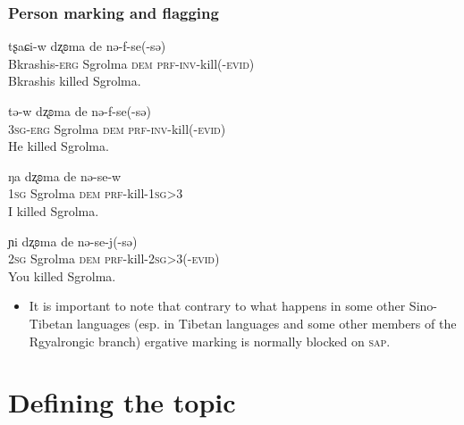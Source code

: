 \documentclass[xcolor=table]{beamer}
\newcommand{\ipa}[1]{{\phon #1}} %
\newcommand{\ipapl}[1]{{\phondroit #1}}
\newcommand{\dem}{\textsc{dem}}
\newcommand{\erg}{\textsc{erg}}
\newcommand{\evid}{\textsc{evid}}
\newcommand{\inv}{\textsc{inv}}
\newcommand{\prf}{\textsc{prf}}
\newcommand{\sg}{\textsc{sg}}
\begin{document}
\begin{frame}%
\frametitle{Person marking and flagging}

\begin{exe}
\ex \label{ex:np3}
\gll
	\ipa{tʂaɕi-w} \ipapl{dʐʚma} 	\ipapl{de} \ipapl{nə-f-se(-sə)} \\
	{Bkrashis-\erg} Sgrolma {\dem} {\prf-\inv-kill(-\evid)}\\ 
	\glt Bkrashis killed Sgrolma.
\end{exe}

\begin{exe}
\ex \label{ex:33}
\gll
	\ipa{tə-w} \ipapl{dʐʚma} \ipapl{de} \ipapl{nə-f-se(-sə)} \\
	{3\sg-\erg} Sgrolma {\dem} {\prf-\inv-kill(-\evid)}\\ 
	\glt He killed Sgrolma.
\end{exe}

\begin{exe}
\ex \label{ex:13}
\gll
	\ipa{ŋa}	\ipapl{dʐʚma} 	\ipapl{de} 	\ipapl{nə-se-w} \\
	{1\sg} Sgrolma {\dem} {\prf-kill-1\sg>3}\\ 
	\glt I killed Sgrolma.
\end{exe}

\begin{exe}
\ex \label{ex:23}
\gll
	\ipa{ɲi}	\ipapl{dʐʚma} 	\ipapl{de} 	\ipapl{nə-se-j(-sə)} \\
	{2\sg} Sgrolma {\dem} {\prf-kill-2\sg>3(-\evid)}\\ 
	\glt You killed Sgrolma.
\end{exe}

\end{frame}


\begin{frame}
 
\begin{itemize}
 \item It is important to note that contrary to what happens in some other Sino-Tibetan languages (esp. in Tibetan languages and some other members of the Rgyalrongic branch) ergative marking is normally blocked on \textsc{sap}.%
\end{itemize}

\end{frame}

\section{Defining the topic}
\end{document}
